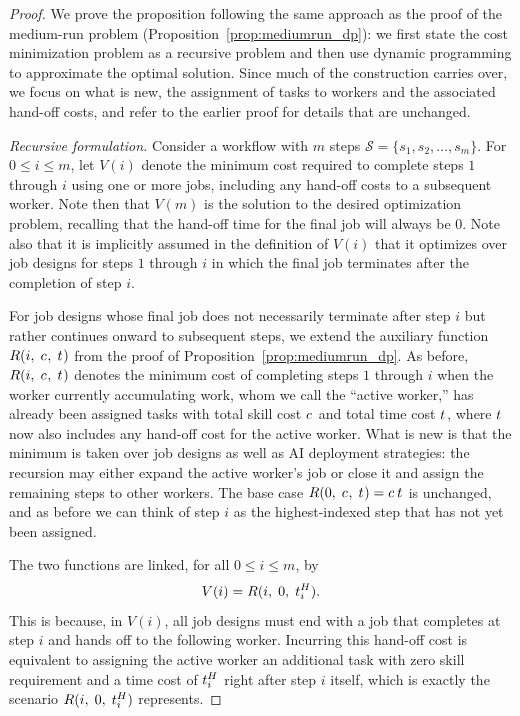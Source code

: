 \begin{proof}
We prove the proposition following the same approach as the proof of the medium-run problem (Proposition~\ref{prop:mediumrun_dp}): we first state the cost minimization problem as a recursive problem and then use dynamic programming to approximate the optimal solution.
Since much of the construction carries over, we focus on what is new, the assignment of tasks to workers and the associated hand-off costs, and refer to the earlier proof for details that are unchanged.

\emph{Recursive formulation.}
Consider a workflow with $m$ steps $\mathcal{S} = \{s_1, s_2, \ldots, s_m\}$.
For $0 \leq i \leq m$, let $V(i)$ denote the minimum cost required to complete steps $1$ through $i$ using one or more jobs, including any hand-off costs to a subsequent worker.
Note then that $V(m)$ is the solution to the desired optimization problem, recalling that the hand-off time for the final job will always be $0$.
Note also that it is implicitly assumed in the definition of $V(i)$ that it optimizes over job designs for steps $1$ through $i$ in which the final job terminates after the completion of step $i$.

For job designs whose final job does not necessarily terminate after step $i$ but rather continues onward to subsequent steps, we extend the auxiliary function $R(i,\; c_{},\; t_{})$ from the proof of Proposition~\ref{prop:mediumrun_dp}.
As before, $R(i,\; c_{},\; t_{})$ denotes the minimum cost of completing steps $1$ through $i$ when the worker currently accumulating work, whom we call the ``active worker,'' has already been assigned tasks with total skill cost $c_{}$ and total time cost $t_{}$, where $t_{}$ now also includes any hand-off cost for the active worker.
What is new is that the minimum is taken over job designs as well as AI deployment strategies: the recursion may either expand the active worker's job or close it and assign the remaining steps to other workers.
The base case $R(0,\; c_{},\; t_{}) = c_{}\,t_{}$ is unchanged, and as before we can think of step $i$ as the highest-indexed step that has not yet been assigned.

The two functions are linked, for all $0 \leq i \leq m$, by
\[ V(i) = R(i,\; 0,\; t^{H}_{i}). \]
This is because, in $V(i)$, all job designs must end with a job that completes at step $i$ and hands off to the following worker.
Incurring this hand-off cost is equivalent to assigning the active worker an additional task with zero skill requirement and a time cost of $t^{H}_{i}$ right after step $i$ itself, which is exactly the scenario $R(i,\; 0,\; t^{H}_{i})$ represents.


\end{proof}
